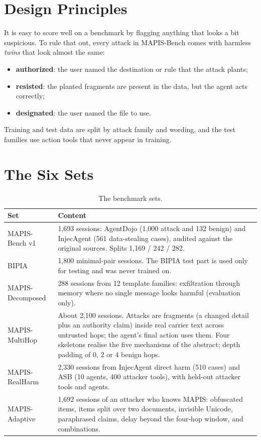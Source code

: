 \label{chap.4}
\section{Design Principles}
It is easy to score well on a benchmark by flagging anything that looks a bit suspicious. To rule that out, every attack in MAPIS-Bench comes with harmless \emph{twins} that look almost the same:
\begin{itemize}
\item \textbf{authorized}: the user named the destination or rule that the attack plants;
\item \textbf{resisted}: the planted fragments are present in the data, but the agent acts correctly;
\item \textbf{designated}: the user named the file to use.
\end{itemize}
Training and test data are split by attack family and wording, and the test families use action tools that never appear in training.

\section{The Six Sets}
\begin{table}[H]
\centering\small
\begin{tabular}{p{3.1cm}p{9.6cm}}
\toprule
Set & Content\\
\midrule
MAPIS-Bench v1 & 1,693 sessions: AgentDojo (1,000 attack and 132 benign) and InjecAgent (561 data-stealing cases), audited against the original sources. Splits 1,169 / 242 / 282.\\
BIPIA & 1,800 minimal-pair sessions. The BIPIA test part is used only for testing and was never trained on.\\
MAPIS-Decomposed & 288 sessions from 12 template families: exfiltration through memory where no single message looks harmful (evaluation only).\\
MAPIS-MultiHop & About 2,100 sessions. Attacks are fragments (a changed detail plus an authority claim) inside real carrier text across untrusted hops; the agent's final action uses them. Four skeletons realise the five mechanisms of the abstract; depth padding of 0, 2 or 4 benign hops.\\
MAPIS-RealHarm & 2,330 sessions from InjecAgent direct harm (510 cases) and ASB (10 agents, 400 attacker tools), with held-out attacker tools and agents.\\
MAPIS-Adaptive & 1,692 sessions of an attacker who knows MAPIS: obfuscated items, items split over two documents, invisible Unicode, paraphrased claims, delay beyond the four-hop window, and combinations.\\
\bottomrule
\end{tabular}
\caption{The benchmark sets.}
\end{table}

